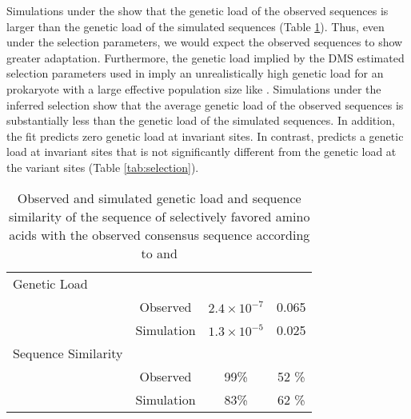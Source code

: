 Simulations under the \phydms show that the genetic load of the observed sequences is larger than the genetic load of the simulated sequences (Table \ref{tab:gl_ss}).
Thus, even under the \phydms selection parameters, we would expect the observed sequences to show greater adaptation.
Furthermore, the genetic load implied by the DMS estimated selection parameters used in \phydms imply an unrealistically high genetic load for an prokaryote with a large effective population size like \ecoli.
Simulations under the \selac inferred selection show that the average genetic load of the observed sequences is substantially less than the genetic load of the simulated sequences. 
In addition, the \selac fit predicts zero genetic load at invariant sites.
In contrast, \phydms predicts a genetic load at invariant sites that is not significantly different from the genetic load at the variant sites (Table \ref{tab:selection}).

\begin{table}
  \centering
  \caption{Observed and simulated genetic load and sequence similarity of the sequence of selectively favored amino acids with the observed consensus sequence according to \selac and \phydms}
  \begin{tabular}{lccc}
    \hline
							& 				& \selac 				& \phydms \\ \hline 
	Genetic Load		 	& 				& 						&		\\
   							&Observed		&$2.4\times 10^{-7}$	& 0.065 \\
    							&Simulation	&$1.3 \times 10^{-5}$ & 0.025 \\
	Sequence Similarity 	& 				& 						&		\\
   							&Observed		&  	99\%				& 52 \% \\
    							&Simulation	&	83\%				& 62 \% \\ \hline
  \end{tabular}
  \label{tab:gl_ss}
\end{table}


